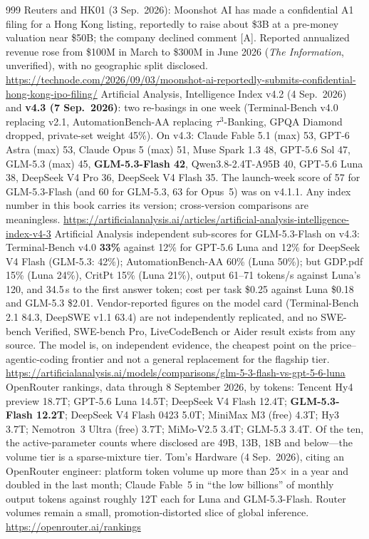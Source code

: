 \begin{thebibliography}{999}
 Reuters and HK01 (3 Sep.\ 2026): Moonshot AI has made a confidential A1 filing for a Hong Kong listing, reportedly to raise about \$3B at a pre-money valuation near \$50B; the company declined comment [A]. Reported annualized revenue rose from \$100M in March to \$300M in June 2026 (\emph{The Information}, unverified), with no geographic split disclosed. \url{https://technode.com/2026/09/03/moonshot-ai-reportedly-submits-confidential-hong-kong-ipo-filing/}
 Artificial Analysis, Intelligence Index v4.2 (4 Sep.\ 2026) and \textbf{v4.3 (7 Sep.\ 2026)}: two re-basings in one week (Terminal-Bench v4.0 replacing v2.1, AutomationBench-AA replacing $\tau^3$-Banking, GPQA Diamond dropped, private-set weight 45\%). On v4.3: Claude Fable 5.1 (max) 53, GPT-6 Astra (max) 53, Claude Opus 5 (max) 51, Muse Spark 1.3 48, GPT-5.6 Sol 47, GLM-5.3 (max) 45, \textbf{GLM-5.3-Flash 42}, Qwen3.8-2.4T-A95B 40, GPT-5.6 Luna 38, DeepSeek V4 Pro 36, DeepSeek V4 Flash 35. The launch-week score of 57 for GLM-5.3-Flash (and 60 for GLM-5.3, 63 for Opus~5) was on v4.1.1. Any index number in this book carries its version; cross-version comparisons are meaningless. \url{https://artificialanalysis.ai/articles/artificial-analysis-intelligence-index-v4-3}
 Artificial Analysis independent sub-scores for GLM-5.3-Flash on v4.3: Terminal-Bench v4.0 \textbf{33\%} against 12\% for GPT-5.6 Luna and 12\% for DeepSeek V4 Flash (GLM-5.3: 42\%); AutomationBench-AA 60\% (Luna 50\%); but GDP.pdf 15\% (Luna 24\%), CritPt 15\% (Luna 21\%), output 61--71 tokens/s against Luna's 120, and 34.5\,s to the first answer token; cost per task \$0.25 against Luna \$0.18 and GLM-5.3 \$2.01. Vendor-reported figures on the model card (Terminal-Bench 2.1 84.3, DeepSWE v1.1 63.4) are not independently replicated, and no SWE-bench Verified, SWE-bench Pro, LiveCodeBench or Aider result exists from any source. The model is, on independent evidence, the cheapest point on the price--agentic-coding frontier and not a general replacement for the flagship tier. \url{https://artificialanalysis.ai/models/comparisons/glm-5-3-flash-vs-gpt-5-6-luna}
 OpenRouter rankings, data through 8 September 2026, by tokens: Tencent Hy4 preview 18.7T; GPT-5.6 Luna 14.5T; DeepSeek V4 Flash 12.4T; \textbf{GLM-5.3-Flash 12.2T}; DeepSeek V4 Flash 0423 5.0T; MiniMax M3 (free) 4.3T; Hy3 3.7T; Nemotron~3 Ultra (free) 3.7T; MiMo-V2.5 3.4T; GLM-5.3 3.4T. Of the ten, the active-parameter counts where disclosed are 49B, 13B, 18B and below---the volume tier is a sparse-mixture tier. Tom's Hardware (4 Sep.\ 2026), citing an OpenRouter engineer: platform token volume up more than 25$\times$ in a year and doubled in the last month; Claude Fable~5 in ``the low billions'' of monthly output tokens against roughly 12T each for Luna and GLM-5.3-Flash. Router volumes remain a small, promotion-distorted slice of global inference. \url{https://openrouter.ai/rankings}

\end{thebibliography}
